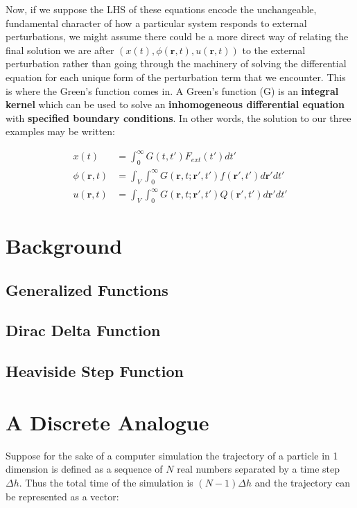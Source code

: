 \documentclass[11pt]{article}
\theoremstyle{plain}
\theoremstyle{definition}
\renewcommand{\vec}[1]{\mathbf{#1}} %
\begin{document}
Now, if we suppose the LHS of these equations encode the unchangeable, fundamental character of how a particular system responds to external perturbations, we might assume there could be a more direct way of relating the final solution we are after $(x(t), \phi(\vec r,t),u(\vec r,t))$ to the external perturbation rather than going through the machinery of solving the differential equation for each unique form of the perturbation term that we encounter. This is where the Green's function comes in. A Green's function (G) is an \textbf{integral kernel} which can be used to solve an \textbf{inhomogeneous differential equation} with \textbf{specified boundary conditions}. In other words, the solution to our three examples may be written:

\begin{align}
    x(t) &= \int_0^{\infty} G(t,t') F_{ext}(t') dt' \\
    \phi(\vec r,t) &= \int_V \int_0^{\infty} G(\vec r, t; \vec r', t') f(\vec r', t') d\vec r' dt' \\
    u(\vec r,t) &= \int_V \int_0^{\infty} G(\vec r, t; \vec r', t') Q(\vec r', t') d\vec r' dt'
\end{align}

\section{Background}
\subsection{Generalized Functions}
\subsection{Dirac Delta Function}
\subsection{Heaviside Step Function}

\section{A Discrete Analogue}

Suppose for the sake of a computer simulation the trajectory of a particle in 1 dimension is defined as a sequence of $N$ real numbers separated by a time step $\Delta h$. Thus the total time of the simulation is $\left( N-1 \right)\Delta h$ and the trajectory can be represented as a vector:
\end{document}

